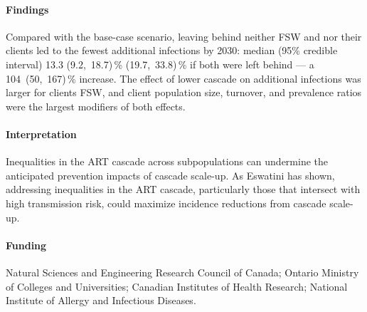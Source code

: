 \paragraph{Findings}
Compared with the base-case scenario, leaving behind neither FSW and nor their clients
led to the fewest additional infections by 2030: median (95\% credible interval)
13.3 (9.2,~18.7)\,\%  (19.7,~33.8)\,\% if both were left behind
--- a 104~(50,~167)\,\% increase.
The effect of lower cascade on additional infections was larger for clients \vs FSW, and
client population size, turnover, and prevalence ratios were the largest modifiers of both effects.
\paragraph{Interpretation}
Inequalities in the ART cascade across subpopulations
can undermine the anticipated prevention impacts of cascade scale-up.
As Eswatini has shown,
addressing inequalities in the ART cascade,
particularly those that intersect with high transmission risk,
could maximize incidence reductions from cascade scale-up.
\paragraph{Funding}
Natural Sciences and Engineering Research Council of Canada;
Ontario Ministry of Colleges and Universities;
Canadian Institutes of Health Research;
National Institute of Allergy and Infectious Diseases.
